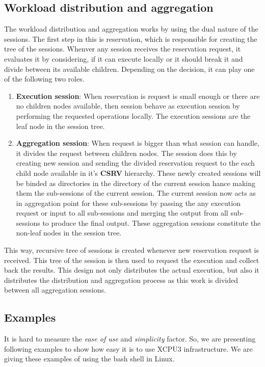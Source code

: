 \documentclass[conference]{IEEEtran}
\begin{document}
\subsection{Workload distribution and aggregation}
The workload distribution and aggregation works by using the dual nature of
the sessions.  The first step in this is reservation, which is responsible for
creating the tree of the sessions.  Whenver any session receives the reservation
request, it evaluates it by considering, if it can execute locally or it should
break it and divide between its available children.  Depending on the decision,
it can play one of the following two roles.
\begin{enumerate}
  \item \textbf{Execution session}: When reservation is request is small enough
  or there are no children nodes available, then session behave as execution
  session by performing the requested operations locally.  The execution
  sessions are the leaf node in the session tree.
  
  \item \textbf{Aggregation session}: When request is bigger than what session
  can handle, it divides the request between children nodes.  The session does
  this by creating new session and sending the divided
  reservation request to the each child node available in it's \textbf{CSRV}
  hierarchy.  These newly created sessions will be binded as directories in the
  directory of the current session hance making them the sub-sessions of the
  current session.  The current session now acts as in aggregation point for
  these sub-sessions by passing the any execution request or input to all
  sub-sessions and merging the output from all sub-sessions to produce the final
  output.  These aggregation sessions constitute the non-leaf nodes in the
  session tree.
\end{enumerate}
This way, recursive tree of sessions is created whenever new reservation request
is received.  This tree of the session is then used to request the execution and
collect back the results.  This design not only distributes the actual
execution, but also it distributes the distribution and aggregation process as
this work is divided between all aggregation sessions.

\subsection{Examples}
It is hard to measure the \textit{ease of use} and \textit{simplicity}
factor.  So, we are presenting following examples to show how easy it is
to use XCPU3 infrastructure.  We are giving these examples of using the bash
shell in Linux.
\end{document}
